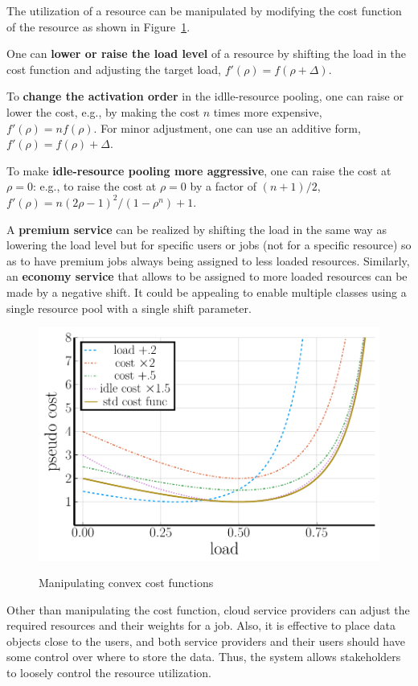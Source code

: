 The utilization of a resource can be manipulated by modifying the cost
function of the resource as shown in Figure~\ref{fig:costfunc3}.

One can {\bf lower or raise the load level} of a resource by shifting
the load in the cost function and adjusting the target load,
$f'(\rho) = f(\rho + \Delta)$.

To {\bf change the activation order} in the idlle-resource pooling,
one can raise or lower the cost,
e.g., by making the cost  $n$ times more expensive, $f'(\rho) = n f(\rho)$.
For minor adjustment, one can use an additive form,
$f'(\rho) = f(\rho) + \Delta$.

To make {\bf idle-resource pooling more aggressive},
one can raise the cost at $\rho = 0$:
e.g., to raise the cost at $\rho = 0$ by a factor of $(n+1)/2$,
$f'(\rho) = n (2\rho - 1)^{2}/(1 - \rho^{n}) + 1$.

A {\bf premium service} can be realized by shifting the load
in the same way as lowering the load level
but for specific users or jobs (not for a specific resource) so as to
have premium jobs always being assigned to less loaded resources.
Similarly, an {\bf economy service} that allows to be assigned to more
loaded resources can be made by a negative shift.
It could be appealing to enable multiple classes using a single
resource pool with a single shift parameter.

\begin{figure}[tb]
  \begin{center}
    \includegraphics[width=0.9\columnwidth]{pseudo_costs_2.pdf}
    \vspace{-2.0ex}
    \caption{Manipulating convex cost functions}
    \label{fig:costfunc3}
  \end{center}
\end{figure}

Other than manipulating the cost function,
cloud service providers can adjust the required resources and their
weights for a job.  Also, it is effective to place data objects close to the
users, and both service providers and their users should have some
control over where to store the data.
Thus, the system allows stakeholders to loosely control the
resource utilization.

